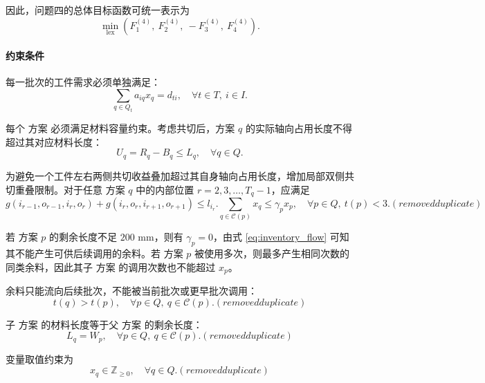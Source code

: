 \documentclass[UTF8]{ctexart}
\begin{document}
因此，问题四的总体目标函数可统一表示为
\begin{equation}
\min_{\mathrm{lex}}\left(F_1^{(4)},\ F_2^{(4)},\ -F_3^{(4)},\ F_4^{(4)}\right).
\end{equation}

\paragraph{约束条件}

每一批次的工件需求必须单独满足：
\begin{equation}
\sum_{q\in Q_t}a_{iq}x_q=d_{ti},
\quad \forall t\in T,\ i\in I.
\label{eq:demand}
\end{equation}

每个 方案 必须满足材料容量约束。考虑共切后，方案 $q$ 的实际轴向占用长度不得超过其对应材料长度：
\begin{equation}
U_q=R_q-B_q\leq L_q,
\quad \forall q\in Q.
\label{eq:p4_xq_int}
\end{equation}

为避免一个工件左右两侧共切收益叠加超过其自身轴向占用长度，增加局部双侧共切重叠限制。对于任意 方案 $q$ 中的内部位置 $r=2,3,\ldots,T_q-1$，应满足
\begin{equation}
g(i_{r-1},o_{r-1},i_r,o_r)
+
g(i_r,o_r,i_{r+1},o_{r+1})
\leq l_{i_r}.
\sum_{q\in\mathcal C(p)}x_q\leq \gamma_p x_p,
\quad \forall p\in Q,\ t(p)<3.
\label{eq} (removed duplicate)
\end{equation}

若 方案 $p$ 的剩余长度不足 $200$ mm，则有 $\gamma_p=0$，由式 \eqref{eq:inventory_flow} 可知其不能产生可供后续调用的余料。若 方案 $p$ 被使用多次，则最多产生相同次数的同类余料，因此其子 方案 的调用次数也不能超过 $x_p$。

余料只能流向后续批次，不能被当前批次或更早批次调用：
\begin{equation}
t(q)>t(p),
\quad \forall p\in Q,\ q\in\mathcal C(p).
\label{eq} (removed duplicate)
\end{equation}

子 方案 的材料长度等于父 方案 的剩余长度：
\begin{equation}
L_q=W_p,
\quad \forall p\in Q,\ q\in\mathcal C(p).
\label{eq} (removed duplicate)
\end{equation}

变量取值约束为
\begin{equation}
x_q\in\mathbb{Z}_{\geq 0},
\quad \forall q\in Q.
\label{eq} (removed duplicate)
\end{equation}
\end{document}
